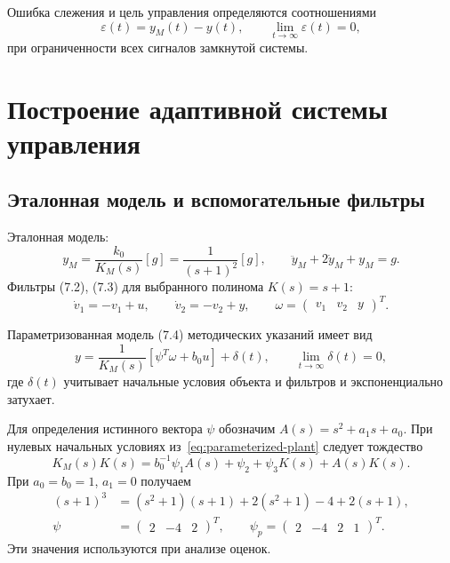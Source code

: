 Ошибка слежения и цель управления определяются соотношениями
\begin{equation}
  \varepsilon(t)=y_M(t)-y(t),
  \qquad \lim_{t\to\infty}\varepsilon(t)=0,
  \label{eq:goal}
\end{equation}
при ограниченности всех сигналов замкнутой системы.

\section{Построение адаптивной системы управления}

\subsection{Эталонная модель и вспомогательные фильтры}

Эталонная модель:
\begin{equation}
  y_M=\frac{k_0}{K_M(s)}[g]
  =\frac{1}{(s+1)^2}[g],
  \qquad \ddot y_M+2\dot y_M+y_M=g.
  \label{eq:reference-model}
\end{equation}
Фильтры (7.2), (7.3) для выбранного полинома $K(s)=s+1$:
\begin{equation}
  \dot v_1=-v_1+u,
  \qquad \dot v_2=-v_2+y,
  \qquad
  \omega=\begin{pmatrix}v_1&v_2&y\end{pmatrix}^{T}.
  \label{eq:filters}
\end{equation}

Параметризованная модель (7.4) методических указаний имеет вид
\begin{equation}
  y=\frac{1}{K_M(s)}[\psi^{T}\omega+b_0u]+\delta(t),
  \qquad \lim_{t\to\infty}\delta(t)=0,
  \label{eq:parameterized-plant}
\end{equation}
где $\delta(t)$ учитывает начальные условия объекта и фильтров
и экспоненциально затухает.

Для определения истинного вектора $\psi$ обозначим
$A(s)=s^2+a_1s+a_0$. При нулевых начальных условиях
из~\eqref{eq:parameterized-plant} следует тождество
\begin{equation}
  K_M(s)K(s)
  =b_0^{-1}\psi_1A(s)+\psi_2+\psi_3K(s)+A(s)K(s).
  \label{eq:polynomial-matching}
\end{equation}
При $a_0=b_0=1$, $a_1=0$ получаем
\begin{equation}
  \begin{aligned}
    (s+1)^3&=(s^2+1)(s+1)+2(s^2+1)-4+2(s+1),\\
    \psi&=\begin{pmatrix}2&-4&2\end{pmatrix}^{T},
    \qquad
    \psi_p=\begin{pmatrix}2&-4&2&1\end{pmatrix}^{T}.
  \end{aligned}
  \label{eq:true-parameters}
\end{equation}
Эти значения используются при анализе оценок.

